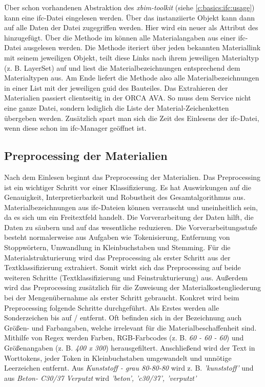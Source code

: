 Über schon vorhandenen Abstraktion des \textit{xbim-toolkit} (siehe \autoref{c:basics:ifc:usage}) kann eine \ac{ifc}-Datei eingelesen werden. Über das instanziierte Objekt  kann dann auf alle Daten der Datei zugegriffen werden. Hier wird ein neuer  als Attribut des  hinzugefügt. Über die Methode  im  können alle Materialangaben aus einer \ac{ifc}-Datei ausgelesen werden. Die Methode iteriert über jeden bekannten Materiallink mit seinem jeweiligen Objekt, teilt diese Links nach ihrem jeweiligen Materialtyp (z. B. LayerSet) auf und liest die Materialbezeichnungen entsprechend dem Materialtypen aus. Am Ende liefert die Methode also alle Materialbezeichnungen in einer List mit der jeweiligen \ac{guid} des Bauteiles.
Das Extrahieren der Materialien passiert clientseitig in der ORCA AVA. So muss dem Service nicht eine ganze Datei, sondern lediglich die Liste der Material-Zeichenketten übergeben werden. Zusätzlich spart man sich die Zeit des Einlesens der \ac{ifc}-Datei, wenn diese schon im \ac{ifc}-Manager geöffnet ist.

\subsection{Preprocessing der Materialien}
\label{c:conception:architecture:preprocessing}
Nach dem Einlesen beginnt das Preprocessing der Materialien.
Das Preprocessing ist ein wichtiger Schritt vor einer Klassifizierung. Es hat Auswirkungen auf die Genauigkeit, Interpretierbarkeit und Robustheit des Gesamtalgorithmus aus. \citep[vgl.][]{Zelaya_2019} Materialbezeichnungen aus \ac{ifc}-Dateien können verrauscht und uneinheitlich sein, da es sich um ein Freitextfeld handelt. Die Vorverarbeitung der Daten hilft, die Daten zu säubern und auf das wesentliche reduzieren. \citep[vgl.][]{Priyanga_2016}
Die Vorverarbeitungsstufe besteht normalerweise aus Aufgaben wie Tokenisierung, Entfernung von Stoppwörtern, Umwandlung in Kleinbuchstaben und Stemming. \citep[vgl.][]{Uysal_2014}
Für die Materialstrukturierung wird das Preprocessing als erster Schritt aus der Textklassifizierung extrahiert. Somit wirkt sich das Preprocessing auf beide weiteren Schritte (Textklassifizierung und Feinstrukturierung) aus. Außerdem wird das Preprocessing zusätzlich für die Zuweisung der Materialkostengliederung bei der Mengenübernahme als erster Schritt gebraucht.
Konkret wird beim Preprocessing folgende Schritte durchgeführt. Als Erstes werden alle Sonderzeichen bis auf \glqq /\grqq{} entfernt. Oft befinden sich in der Bezeichnung auch Größen- und Farbangaben, welche irrelevant für die Materialbeschaffenheit sind.
Mithilfe von Regex werden Farben, RGB-Farbcodes (z. B. \textit{60 - 60 - 60}) und Größenangaben (z. B. \textit{400 x 300}) herausgefiltert. Anschließend wird der Text in Worttokens, jeder Token in Kleinbuchstaben umgewandelt und unnötige Leerzeichen entfernt. Aus \textit{\glqq Kunststoff - grau 80-80-80\grqq{}} wird z. B. \textit{\glqq 'kunststoff'\grqq{}} und aus \textit{\glqq Beton- C30/37 Verputzt\grqq{}} wird \textit{\glqq 'beton', 'c30/37', 'verputzt'\grqq{}}

